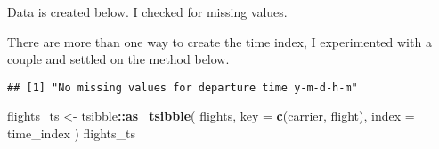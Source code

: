 \documentclass[
]{article}
\newenvironment{Shaded}{\begin{snugshade}}{\end{snugshade}}
\newcommand{\AttributeTok}[1]{\textcolor[rgb]{0.13,0.29,0.53}{#1}}
\newcommand{\CommentTok}[1]{\textcolor[rgb]{0.56,0.35,0.01}{\textit{#1}}}
\newcommand{\ControlFlowTok}[1]{\textcolor[rgb]{0.13,0.29,0.53}{\textbf{#1}}}
\newcommand{\FunctionTok}[1]{\textcolor[rgb]{0.13,0.29,0.53}{\textbf{#1}}}
\newcommand{\NormalTok}[1]{#1}
\newcommand{\OtherTok}[1]{\textcolor[rgb]{0.56,0.35,0.01}{#1}}
\newcommand{\SpecialCharTok}[1]{\textcolor[rgb]{0.81,0.36,0.00}{\textbf{#1}}}
\newcommand{\StringTok}[1]{\textcolor[rgb]{0.31,0.60,0.02}{#1}}
\begin{document}
Data is created below. I checked for missing values.

There are more than one way to create the time index, I experimented
with a couple and settled on the method below.

\begin{Shaded}
\end{Shaded}

\begin{verbatim}
## [1] "No missing values for departure time y-m-d-h-m"
\end{verbatim}

\begin{Shaded}
\end{Shaded}

\begin{Shaded}
\begin{Highlighting}[]
\NormalTok{flights\_ts }\OtherTok{\textless{}{-}} 
\NormalTok{  tsibble}\SpecialCharTok{::}\FunctionTok{as\_tsibble}\NormalTok{(}
\NormalTok{    flights,}
    \AttributeTok{key =} \FunctionTok{c}\NormalTok{(carrier, flight),}
    \AttributeTok{index =}\NormalTok{ time\_index}
\NormalTok{  )}
\NormalTok{flights\_ts}
\end{Highlighting}
\end{Shaded}
\end{document}
